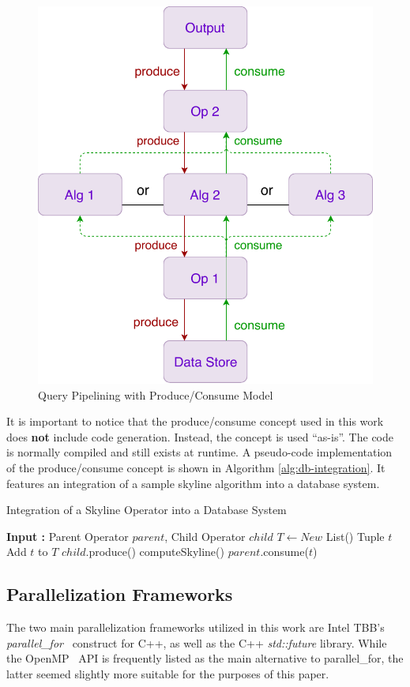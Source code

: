 \begin{figure}[h]
	\centering
	\includegraphics[height=0.6\linewidth]{figures/produce-consume-model}
	\caption{Query Pipelining with Produce/Consume Model}
	\label{fig:produce-consume-model}
\end{figure}

It is important to notice that the produce/consume concept used in this work does \textbf{not} include code generation. Instead, the concept is used ``as-is''. The code is normally compiled and still exists at runtime. A pseudo-code implementation of the produce/consume concept is shown in Algorithm \ref{alg:db-integration}. It features an integration of a sample skyline algorithm into a database system. 

\begin{algorithm}[h!]
	\caption{Integration of a Skyline Operator into a Database System} \label{alg:db-integration}
	\begin{algorithmic}[]
		\State \textbf{Input :} Parent Operator $parent$, Child Operator $child$
		\State $T \gets New$ List()
		 {Tuple $t$}
			\State Add $t$ to $T$
		\EndFunction
		 {}
			\State $child$.produce()
			\State computeSkyline()
		\EndFunction
		 {}
					\State $parent$.consume($t$)
				\EndIf
			\EndFor
		\EndFunction
	\end{algorithmic}
\end{algorithm}

\subsection{Parallelization Frameworks}
The two main parallelization frameworks utilized in this work are Intel TBB's \textit{parallel\_for}~\cite{parallel-for} construct for C++, as well as the C++ \textit{std::future} library. While the OpenMP~\cite{openmp} API is frequently listed as the main alternative to parallel\_for, the latter seemed slightly more suitable for the purposes of this paper. 

